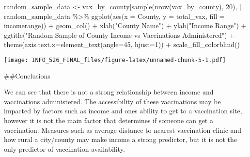 \documentclass[
]{article}
\newenvironment{Shaded}{\begin{snugshade}}{\end{snugshade}}
\newcommand{\AttributeTok}[1]{\textcolor[rgb]{0.77,0.63,0.00}{#1}}
\newcommand{\DecValTok}[1]{\textcolor[rgb]{0.00,0.00,0.81}{#1}}
\newcommand{\FunctionTok}[1]{\textcolor[rgb]{0.00,0.00,0.00}{#1}}
\newcommand{\NormalTok}[1]{#1}
\newcommand{\OtherTok}[1]{\textcolor[rgb]{0.56,0.35,0.01}{#1}}
\newcommand{\SpecialCharTok}[1]{\textcolor[rgb]{0.00,0.00,0.00}{#1}}
\newcommand{\StringTok}[1]{\textcolor[rgb]{0.31,0.60,0.02}{#1}}
\begin{document}
\begin{Shaded}
\begin{Highlighting}[]
\NormalTok{random\_sample\_data }\OtherTok{\textless{}{-}}\NormalTok{ vax\_by\_county[}\FunctionTok{sample}\NormalTok{(}\FunctionTok{nrow}\NormalTok{(vax\_by\_county), }\DecValTok{20}\NormalTok{), ]}
\NormalTok{random\_sample\_data }\SpecialCharTok{\%\textgreater{}\%}
  \FunctionTok{ggplot}\NormalTok{(}\FunctionTok{aes}\NormalTok{(}\AttributeTok{x =}\NormalTok{ County,}
             \AttributeTok{y =}\NormalTok{ total\_vax,}
             \AttributeTok{fill =}\NormalTok{ incomerange)) }\SpecialCharTok{+} 
  \FunctionTok{geom\_col}\NormalTok{() }\SpecialCharTok{+}
  \FunctionTok{xlab}\NormalTok{(}\StringTok{"County Name"}\NormalTok{) }\SpecialCharTok{+} 
  \FunctionTok{ylab}\NormalTok{(}\StringTok{"Income Range"}\NormalTok{) }\SpecialCharTok{+}
  \FunctionTok{ggtitle}\NormalTok{(}\StringTok{"Random Sample of County Income vs Vaccinations Administered"}\NormalTok{) }\SpecialCharTok{+}
  \FunctionTok{theme}\NormalTok{(}\AttributeTok{axis.text.x=}\FunctionTok{element\_text}\NormalTok{(}\AttributeTok{angle=}\DecValTok{45}\NormalTok{, }\AttributeTok{hjust=}\DecValTok{1}\NormalTok{)) }\SpecialCharTok{+}
  \FunctionTok{scale\_fill\_colorblind}\NormalTok{()}
\end{Highlighting}
\end{Shaded}

\texttt{[image: INFO\_526\_FINAL\_files/figure-latex/unnamed-chunk-5-1.pdf]}

\#\#Conclusions

We can see that there is not a strong relationship between income and
vaccinations administered. The accessibility of these vaccinations may
be impacted by factors such as income and ones ability to get to a
vaccination site, however it is not the main factor that determines if
someone can get a vaccination. Measures such as average distance to
nearest vaccination clinic and how rural a city/county may make income a
strong predictor, but it is not the only predictor of vaccination
availability.
\end{document}
